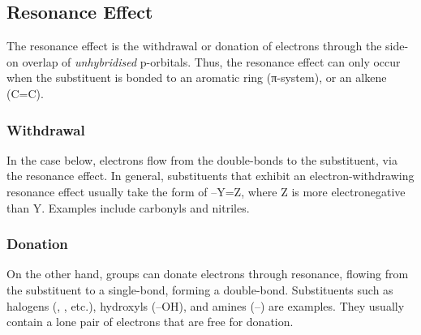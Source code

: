 
\pagebreak
\subsection{Resonance Effect}

	The resonance effect is the withdrawal or donation of electrons through the side-on overlap of \textit{unhybridised} p-orbitals.
	Thus, the resonance effect can only occur when the substituent is bonded to an aromatic ring (π-system), or an alkene (C=C).


	\subsubsection{Withdrawal}

		In the case below, electrons flow from the double-bonds to the substituent, via the resonance effect. In general, substituents
		that exhibit an electron-withdrawing resonance effect usually take the form of –Y=Z, where Z is more electronegative than Y.
		Examples include carbonyls and nitriles.




	\subsubsection{Donation}

		On the other hand, groups can donate electrons through resonance, flowing from the substituent to a single-bond, forming
		a double-bond. Substituents such as halogens (, \ce{\chlorine}, etc.), hydroxyls (–OH), and amines (–)
		are examples. They usually contain a lone pair of electrons that are free for donation.



